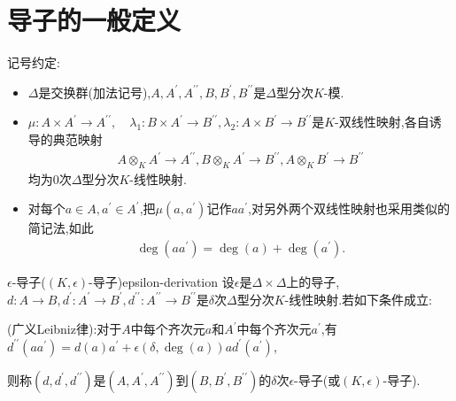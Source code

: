 \section{导子的一般定义}

记号约定:

\begin{itemize}
	\item $\Delta$是交换群(加法记号),$A,A^{\prime},A^{\prime\prime},B,B^{\prime},B^{\prime\prime}$是$\Delta$型分次$K$-模.
	\item $\mu:A\times A^{\prime}\to A^{\prime\prime}, \quad \lambda_{1}:B\times A^{\prime}\to B^{\prime\prime},\lambda_{2}:A\times B^{\prime}\to B^{\prime\prime}$是$K$-双线性映射,各自诱导的典范映射
	\begin{align*}
		A\otimes_{K}A^{\prime}\to A^{\prime\prime},B\otimes_{K}A^{\prime}\to B^{\prime\prime},A\otimes_{K}B^{\prime}\to B^{\prime\prime}
	\end{align*}
	均为$0$次$\Delta$型分次$K$-线性映射.
	\item 对每个$a\in A,a^{\prime}\in A^{\prime}$,把$\mu\left(a,a^{\prime}\right)$记作$aa^{\prime}$,对另外两个双线性映射也采用类似的简记法,如此
	\begin{align*}
		\deg\left(aa^{\prime}\right)=\deg\left(a\right)+\deg\left(a^{\prime}\right).
	\end{align*}
\end{itemize}

\begin{definition}{$\epsilon$-导子($\left(K,\epsilon\right)$-导子)}{epsilon-derivation}
	设$\epsilon$是$\Delta\times\Delta$上的导子,$d:A\to B,d^{\prime}:A^{\prime}\to B^{\prime},d^{\prime\prime}:A^{\prime\prime}\to B^{\prime\prime}$是$\delta$次$\Delta$型分次$K$-线性映射.若如下条件成立:
	\begin{center}
		(广义Leibniz律):对于$A$中每个齐次元$a$和$A^{\prime}$中每个齐次元$a^{\prime}$,有$d^{\prime\prime}(aa^{\prime})=d\left(a\right)a^{\prime}+\epsilon\left(\delta, \deg(a)\right)ad^{\prime}\left(a^{\prime}\right)$,
	\end{center}
	则称$\left(d,d^{\prime},d^{\prime\prime}\right)$是$\left(A,A^{\prime},A^{\prime\prime}\right)$到$\left(B,B^{\prime},B^{\prime\prime}\right)$的$\delta$次$\epsilon$-导子(或$\left(K,\epsilon\right)$-导子).
\end{definition}

